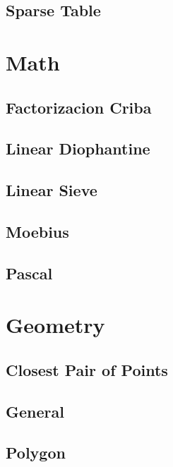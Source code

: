 \subsection{   Sparse Table}
\raggedbottom
\hrulefill

\section{Math}
\subsection{	Factorizacion Criba}
\raggedbottom
\hrulefill
\subsection{	Linear Diophantine}
\raggedbottom
\hrulefill
\subsection{	Linear Sieve}
\raggedbottom
\hrulefill
\subsection{	Moebius}
\raggedbottom
\hrulefill
\subsection{	Pascal}
\raggedbottom
\hrulefill

\section{Geometry}
\subsection{	Closest Pair of Points}
\raggedbottom
\hrulefill
\subsection{	General}
\raggedbottom
\hrulefill
\subsection{	Polygon}
\raggedbottom
\hrulefill
